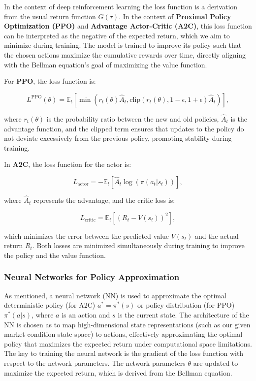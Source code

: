 In the context of deep reinforcement learning the loss function is a derivation from the usual return function \( G(\tau) \). In the context of \textbf{Proximal Policy Optimization (PPO)} and \textbf{Advantage Actor-Critic (A2C)}, this loss function can be interpreted as the negative of the expected return, which we aim to minimize during training. The model is trained to improve its policy such that the chosen actions maximize the cumulative rewards over time, directly aligning with the Bellman equation’s goal of maximizing the value function.

For \textbf{PPO}, the loss function is:

$$
L^{\text{PPO}}(\theta) = \mathbb{E}_t \left[ \min \left( r_t(\theta) \hat{A}_t, \text{clip}(r_t(\theta), 1 - \epsilon, 1 + \epsilon) \hat{A}_t \right) \right],
$$

where \( r_t(\theta) \) is the probability ratio between the new and old policies, \( \hat{A}_t \) is the advantage function, and the clipped term ensures that updates to the policy do not deviate excessively from the previous policy, promoting stability during training.

In \textbf{A2C}, the loss function for the actor is:

$$
L_{\text{actor}} = - \mathbb{E}_t \left[ \hat{A}_t \log(\pi(a_t | s_t)) \right],
$$

where \( \hat{A}_t \) represents the advantage, and the critic loss is:

$$
L_{\text{critic}} = \mathbb{E}_t \left[ \left( R_t - V(s_t) \right)^2 \right],
$$

which minimizes the error between the predicted value \( V(s_t) \) and the actual return \( R_t \). Both losses are minimized simultaneously during training to improve the policy and the value function.

\subsubsection{Neural Networks for Policy Approximation}

As mentioned, a neural network (NN) is used to approximate the optimal deterministic policy (for A2C) $a^* = \pi^*(s)$ or policy distribution (for PPO) $\pi^*(a | s)$, where $a$ is an action and $s$ is the current state. The architecture of the NN is chosen as to map high-dimensional state representations (such as our given market condition state space) to actions, effectively approximating the optimal policy that maximizes the expected return under computational space limitations. The key to training the neural network is the gradient of the loss function with respect to the network parameters. The network parameters $\theta$ are updated to maximize the expected return, which is derived from the Bellman equation.


